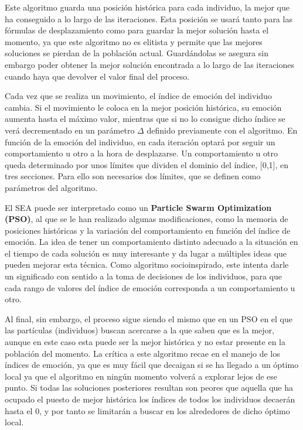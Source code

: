 Este algoritmo guarda una posición histórica para cada individuo, la mejor que ha conseguido a lo largo de las iteraciones. Esta posición se usará tanto para las fórmulas de desplazamiento como para guardar la mejor solución hasta el momento, ya que este algoritmo no es elitista y permite que las mejores soluciones se pierdan de la población actual. Guardándolas se asegura sin embargo poder obtener la mejor solución encontrada a lo largo de las iteraciones cuando haya que devolver el valor final del proceso.

Cada vez que se realiza un movimiento, el índice de emoción del individuo cambia. Si el movimiento le coloca en la mejor posición histórica, su emoción aumenta hasta el máximo valor, mientras que si no lo consigue dicho índice se verá decrementado en un parámetro $\Delta$ definido previamente con el algoritmo. En función de la emoción del individuo, en cada iteración optará por seguir un comportamiento u otro a la hora de desplazarse. Un comportamiento u otro queda determinado por unos límites que dividen el dominio del índice, [0,1], en tres secciones. Para ello son necesarios dos límites, que se definen como parámetros del algoritmo.

El SEA puede ser interpretado como un \textbf{Particle Swarm Optimization (PSO)}, al que se le han realizado algunas modificaciones, como la memoria de posiciones históricas y la variación del comportamiento en función del índice de emoción. La idea de tener un comportamiento distinto adecuado a la situación en el tiempo de cada solución es muy interesante y da lugar a múltiples ideas que pueden mejorar esta técnica. Como algoritmo socioinspirado, este intenta darle un significado con sentido a la toma de decisiones de los individuos, para que cada rango de valores del índice de emoción corresponda a un comportamiento u otro.

Al final, sin embargo, el proceso sigue siendo el mismo que en un PSO en el que las partículas (individuos) buscan acercarse a la que saben que es la mejor, aunque en este caso esta puede ser la mejor histórica y no estar presente en la población del momento. La crítica a este algoritmo recae en el manejo de los índices de emoción, ya que es muy fácil que decaigan si se ha llegado a un óptimo local ya que el algoritmo en ningún momento volverá a explorar lejos de ese punto. Si todas las soluciones posteriores resultan son peores que aquella que ha ocupado el puesto de mejor histórica los índices de todos los individuos decaerán hasta el 0, y por tanto se limitarán a buscar en los alrededores de dicho óptimo local.


